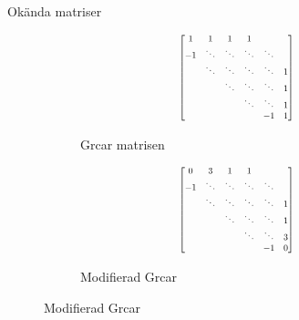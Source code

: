 \documentclass{beamer}
\begin{document}
\begin{frame}{Okända matriser}
    \begin{figure}[H]
    \centering
    \begin{subfigure}{0.3\textwidth}
        \centering
        \[
        \scalebox{0.7}{$\begin{bmatrix}
        1 & 1 & 1 &1  \\
        -1&\ddots&\ddots&\ddots&\ddots\\
        & \ddots&\ddots &\ddots  &\ddots &1\\
        & &\ddots & \ddots &\ddots &1\\
        &  & & \ddots& \ddots & 1\\
        & & &  & -1& 1
    \end{bmatrix}$}
        \]
        \caption{Grcar matrisen}
    \end{subfigure}
    \begin{subfigure}{0.3\textwidth}
        \centering
        \[
     \scalebox{0.7}{$\begin{bmatrix}
        0 & 3 & 1 &1 & \\
    -1&\ddots&\ddots&\ddots&\ddots\\
     & \ddots &\ddots &\ddots &\ddots &1\\
     & &\ddots  & \ddots& \ddots&1\\
     &  & &\ddots  &\ddots &3\\
     & & & & -1& 0
        \end{bmatrix}$}
        \]
        \caption{Modifierad Grcar}
        \end{subfigure}
    \end{figure}
\end{frame}
\end{document}
